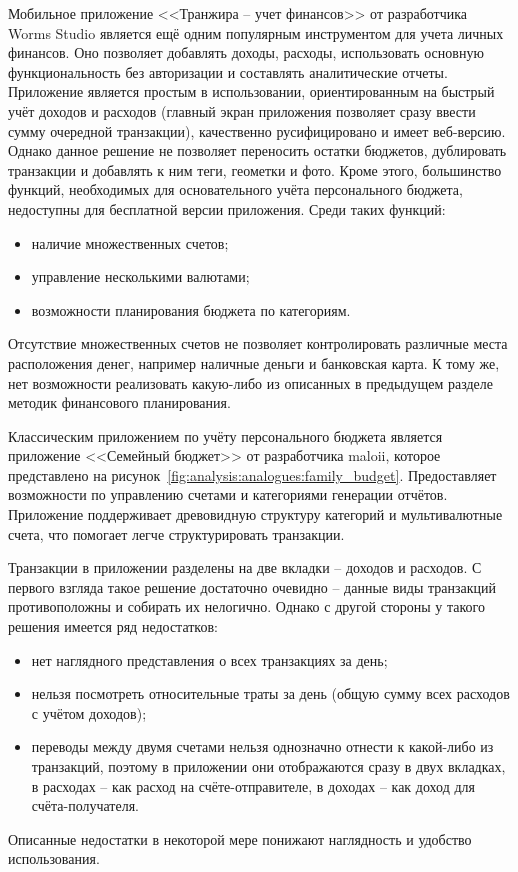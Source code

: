 Мобильное приложение <<Транжира -- учет финансов>> от разработчика Worms Studio является ещё одним популярным инструментом для учета личных финансов.
Оно позволяет добавлять доходы, расходы, использовать основную функциональность без авторизации и составлять аналитические отчеты.
Приложение является простым в использовании, ориентированным на быстрый учёт доходов и расходов (главный экран приложения позволяет сразу ввести сумму очередной транзакции), качественно русифицировано и имеет веб-версию.
Однако данное решение не позволяет переносить остатки бюджетов, дублировать транзакции и добавлять к ним теги, геометки и фото.
Кроме этого, большинство функций, необходимых для основательного учёта персонального бюджета, недоступны для бесплатной версии приложения.
Среди таких функций:
\begin{itemize}
    \item наличие множественных счетов;
    \item управление несколькими валютами;
    \item возможности планирования бюджета по категориям.
\end{itemize}

Отсутствие множественных счетов не позволяет контролировать различные места расположения денег, например наличные деньги и банковская карта.
К тому же, нет возможности реализовать какую-либо из описанных в предыдущем разделе методик финансового планирования.

Классическим приложением по учёту персонального бюджета является приложение <<Семейный бюджет>> от разработчика maloii, которое представлено на рисунок~\ref{fig:analysis:analogues:family_budget}.
Предоставляет возможности по управлению счетами и категориями генерации отчётов.
Приложение поддерживает древовидную структуру категорий и мультивалютные счета, что помогает легче структурировать транзакции.

Транзакции в приложении разделены на две вкладки -- доходов и расходов.
С первого взгляда такое решение достаточно очевидно -- данные виды транзакций противоположны и собирать их нелогично.
Однако с другой стороны у такого решения имеется ряд недостатков:
\begin{itemize}
    \item нет наглядного представления о всех транзакциях за день;
    \item нельзя посмотреть относительные траты за день (общую сумму всех расходов с учётом доходов);
    \item переводы между двумя счетами нельзя однозначно отнести к какой-либо из транзакций, поэтому в приложении они отображаются сразу в двух вкладках, в расходах -- как расход на счёте-отправителе, в доходах -- как доход для счёта-получателя.
\end{itemize}
Описанные недостатки в некоторой мере понижают наглядность и удобство использования.

